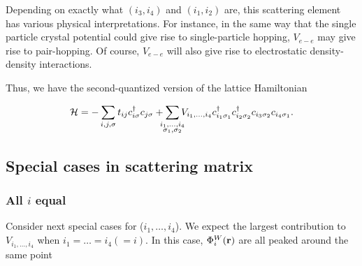 Depending on exactly what $(i_3, i_4)$ and $(i_1, i_2)$ are, this scattering element has various physical interpretations. For instance, in the same way that the single particle crystal potential could give rise to single-particle hopping, $V_{e-e}$ may give rise to pair-hopping. Of course, $V_{e-e}$ will also give rise to electrostatic density-density interactions. 

Thus, we have the second-quantized version of the lattice Hamiltonian
\begin{tcolorbox}
	\begin{equation}
		\Ha = -\sum_{i,j,\sigma}t_{ij}\cd_{i\sigma}c_{j\sigma} + \sum_{\mathclap{\substack{i_1,\dots,i_4\\ \sigma_1, \sigma_2}}}V_{i_1,\dots,i_4}\cd_{i_1\sigma_1}\cd_{i_2\sigma_2}c_{i_3\sigma_2}c_{i_4\sigma_1}.
	\end{equation}
\end{tcolorbox}

\subsection{Special cases in scattering matrix}
\subsubsection*{All $i$ equal}
Consider next special cases for ($i_1,\dots, i_4$). We expect the largest contribution to $V_{i_1, \dots,i_4}$ when $i_1 = \dots = i_4 (=i)$.
In this case, $\Phi_{i}^{W}(\vb r)$ are all peaked around the same point

